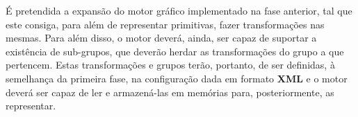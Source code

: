 \noindent
É pretendida a expansão do motor gráfico implementado na
fase anterior, tal que este consiga, para além de
representar primitivas, fazer transformações nas mesmas.
\newline
\break
\noindent
Para além disso, o motor deverá, ainda, ser capaz de
suportar a existência de sub-grupos, que deverão herdar as
transformações do grupo a que pertencem.
\newline
\break
\noindent
Estas transformações e grupos terão, portanto, de ser
definidas, à semelhança da primeira fase, na configuração
dada em formato \textbf{XML} e o motor deverá ser capaz
de ler e armazená-las em memórias para,
posteriormente, as representar.